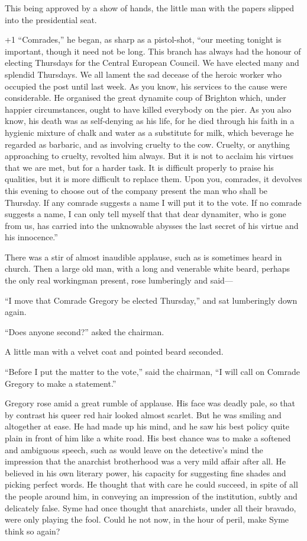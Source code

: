 This being approved by a show of hands, the little man with the papers slipped into the presidential seat.

\looseness+1
“Comrades,” he began, as sharp as a pistol-shot, “our meeting tonight is important, though it need not be long. This branch has always had the honour of electing Thursdays for the Central European Council. We have elected many and splendid Thursdays. We all lament the sad decease of the heroic worker who occupied the post until last week. As you know, his services to the cause were considerable. He organised the great dynamite coup of Brighton which, under happier circumstances, ought to have killed everybody on the pier. As you also know, his death was as self-denying as his life, for he died through his faith in a hygienic mixture of chalk and water as a substitute for milk, which beverage he regarded as barbaric, and as involving cruelty to the cow. Cruelty, or anything approaching to cruelty, revolted him always. But it is not to acclaim his virtues that we are met, but for a harder task. It is difficult properly to praise his qualities, but it is more difficult to replace them. Upon you, comrades, it devolves this evening to choose out of the company present the man who shall be Thursday. If any comrade suggests a name I will put it to the vote. If no comrade suggests a name, I can only tell myself that that dear dynamiter, who is gone from us, has carried into the unknowable abysses the last secret of his virtue and his innocence.”

There was a stir of almost inaudible applause, such as is sometimes heard in church. Then a large old man, with a long and venerable white beard, perhaps the only real workingman present, rose lumberingly and said⁠—

“I move that Comrade Gregory be elected Thursday,” and sat lumberingly down again.

“Does anyone second?” asked the chairman.

A little man with a velvet coat and pointed beard seconded.

“Before I put the matter to the vote,” said the chairman, “I will call on Comrade Gregory to make a statement.”

Gregory rose amid a great rumble of applause. His face was deadly pale, so that by contrast his queer red hair looked almost scarlet. But he was smiling and altogether at ease. He had made up his mind, and he saw his best policy quite plain in front of him like a white road. His best chance was to make a softened and ambiguous speech, such as would leave on the detective’s mind the impression that the anarchist brotherhood was a very mild affair after all. He believed in his own literary power, his capacity for suggesting fine shades and picking perfect words. He thought that with care he could succeed, in spite of all the people around him, in conveying an impression of the institution, subtly and delicately false. Syme had once thought that anarchists, under all their bravado, were only playing the fool. Could he not now, in the hour of peril, make Syme think so again?

